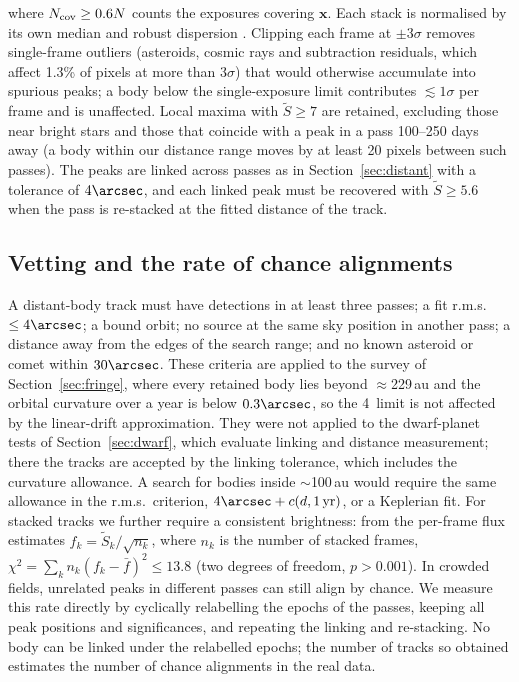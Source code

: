 \documentclass[twocolumn,linenumbers,anonymous]{aastex702}
\begin{document}
where $N_{\rm cov} \ge 0.6N$ counts the exposures covering $\mathbf{x}$. Each stack is normalised by its own median and robust dispersion \citep[median absolute deviation;][]{rousseeuw93}. Clipping each frame at $\pm 3\sigma$ removes single-frame outliers (asteroids, cosmic rays and subtraction residuals, which affect 1.3\% of pixels at more than $3\sigma$) that would otherwise accumulate into spurious peaks; a body below the single-exposure limit contributes $\lesssim 1\sigma$ per frame and is unaffected. Local maxima with $\widetilde{S} \ge 7$ are retained, excluding those near bright stars and those that coincide with a peak in a pass 100--250 days away (a body within our distance range moves by at least 20 pixels between such passes). The peaks are linked across passes as in Section~\ref{sec:distant} with a tolerance of $4\arcsec$, and each linked peak must be recovered with $\widetilde{S} \ge 5.6$ when the pass is re-stacked at the fitted distance of the track.

\subsection{Vetting and the rate of chance alignments}\label{sec:vet}
A distant-body track must have detections in at least three passes; a fit r.m.s.\ $\le 4\arcsec$; a bound orbit; no source at the same sky position in another pass; a distance away from the edges of the search range; and no known asteroid or comet within $30\arcsec$. These criteria are applied to the survey of Section~\ref{sec:fringe}, where every retained body lies beyond $\approx$229\,au and the orbital curvature over a year is below $0.3\arcsec$, so the 4\arcsec\ limit is not affected by the linear-drift approximation. They were not applied to the dwarf-planet tests of Section~\ref{sec:dwarf}, which evaluate linking and distance measurement; there the tracks are accepted by the linking tolerance, which includes the curvature allowance. A search for bodies inside $\sim$100\,au would require the same allowance in the r.m.s.\ criterion, $4\arcsec + c(d, 1\,\mathrm{yr})$, or a Keplerian fit. For stacked tracks we further require a consistent brightness: from the per-frame flux estimates $f_k = \widetilde{S}_k/\sqrt{n_k}$, where $n_k$ is the number of stacked frames, $\chi^2 = \sum_k n_k (f_k - \bar{f})^2 \le 13.8$ (two degrees of freedom, $p > 0.001$). In crowded fields, unrelated peaks in different passes can still align by chance. We measure this rate directly by cyclically relabelling the epochs of the passes, keeping all peak positions and significances, and repeating the linking and re-stacking. No body can be linked under the relabelled epochs; the number of tracks so obtained estimates the number of chance alignments in the real data.
\end{document}
